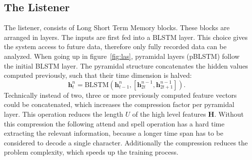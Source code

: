 \documentclass{article}
\begin{document}
\subsection{The Listener}
\label{subsec:Listener}
The listener, consists of Long Short Term Memory blocks. These blocks are arranged in layers. The inputs are first fed into a BLSTM layer. This choice gives the system access to future data, therefore only fully recorded data can be analyzed. When going up in figure~\ref{fig:las}, pyramidal layers (pBLSTM) follow the initial BLSTM layer. The pyramidal structure concatenates the hidden values computed previously, such that their time dimension is halved:
\begin{equation}
\mathbf{h}_{t}^n = \text{BLSTM}(\mathbf{h}_{t-1}^{n}, [\mathbf{h}_{2t}^{n-1}, \mathbf{h}_{2t+1}^{n-1}]).
\end{equation}
Technically instead of two, three or more previously computed feature vectors could be concatenated, which increases the compression factor per pyramidal layer.
This operation reduces the length $U$ of the high level features $\mathbf{H}$. Without this compression the following attend and spell operation has a hard time extracting the relevant information, because a longer time span has to be considered to decode a single character. Additionally the compression reduces the problem complexity, which speeds up the training process.
\end{document}
